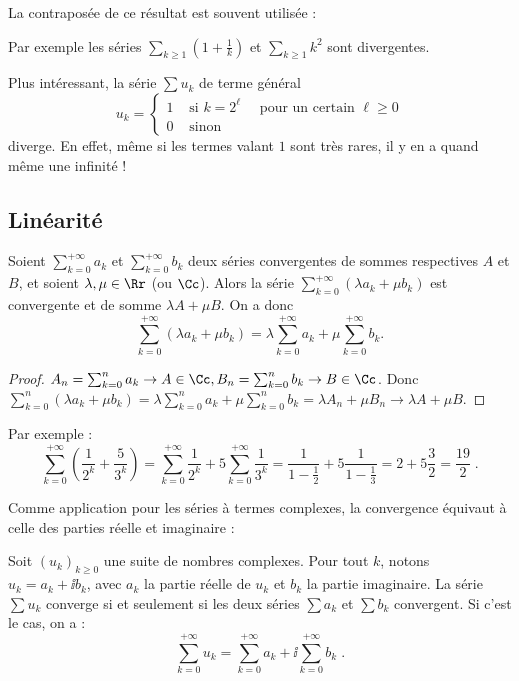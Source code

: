 \documentclass[class=report,crop=false]{standalone}
\begin{document}
\bigskip

La contraposée de ce résultat est souvent utilisée : 

Par exemple les séries $\sum_{k \ge 1} (1+\frac{1}{k})$ et $\sum_{k \ge 1} k^2$ sont 
divergentes.

Plus intéressant, la série $\sum u_k$ de terme général 
$$
u_k = \left\{
\begin{array}{ll}
1&\text{ si } k=2^\ell \quad \text{ pour un certain } \ell \ge 0 \\
0&\text{ sinon }
\end{array}
\right.
$$
diverge. En effet, même si les termes valant $1$ sont très rares, il y en a quand
même une infinité !

\subsection{Linéarité}

\begin{proposition}
Soient $\sum_{k=0}^{+\infty} a_k$ et $\sum_{k=0}^{+\infty} b_k$ 
deux séries convergentes de sommes respectives $A$ et $B$, et soient $\lambda, \mu \in \Rr$ (ou $\Cc$).
Alors la série $\sum_{k=0}^{+\infty} (\lambda a_k+\mu b_k)$ est convergente et de somme
 $\lambda A+\mu B$. On a donc
 $$\sum_{k=0}^{+\infty} (\lambda a_k+\mu b_k) = 
 \lambda \sum_{k=0}^{+\infty} a_k+ \mu \sum_{k=0}^{+\infty} b_k.$$

\end{proposition}
\begin{proof}
$A_n=\sum_{k=0}^n a_k\to A\in\Cc, B_n=\sum_{k=0}^n b_k\to B\in\Cc$. Donc
$ \sum_{k=0}^n (\lambda a_k+\mu b_k) 
= \lambda  \sum_{k=0}^n a_k + \mu \sum_{k=0}^n b_k 
= \lambda A_n + \mu B_n \to \lambda A +\mu B$.
\end{proof}


Par exemple :
$$
\sum_{k=0}^{+\infty} \left(\frac{1}{2^k}+\frac{5}{3^k}\right)
 = 
\sum_{k=0}^{+\infty} \frac{1}{2^k}+
5\sum_{k=0}^{+\infty} \frac{1}{3^k}
=
\frac{1}{1-\frac{1}{2}}+5\frac{1}{1-\frac{1}{3}} =
 2+5\frac{3}{2}=\frac{19}{2}\;.
$$

\bigskip

Comme application pour les séries à termes complexes, la convergence équivaut à
celle des parties réelle et imaginaire :
 
\begin{proposition}
\label{prop:reimseries}
Soit $(u_k)_{k\ge0}$ une suite de nombres complexes. Pour tout $k$, notons
$u_k = a_k + \ii b_k$, avec $a_k$ la partie réelle de $u_k$ et $b_k$ la partie imaginaire. 
La série $\sum u_k$ converge si et seulement si les deux séries 
$\sum a_k$ et $\sum b_k$ convergent. Si c'est le cas, on a :
$$
\sum_{k=0}^{+\infty} u_k = 
\sum_{k=0}^{+\infty} a_k + \ii \sum_{k=0}^{+\infty} b_k\;. 
$$
\end{proposition}
\end{document}
